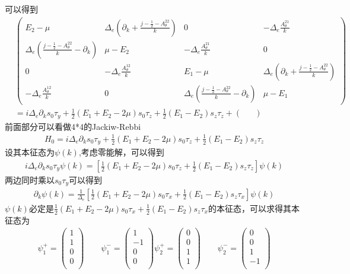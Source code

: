 \documentclass[22pt]{article}
\begin{document}
	可以得到
	\begin{align}
		&\nonumber
		\begin{pmatrix}
			E_2-\mu &\Delta_e(\partial_k+\frac{j-\frac{1}{2}-A_{\theta}^{22}}{k})&0&-\Delta_e\frac{A_{\theta}^{21}}{k}\\
			\Delta_e(\frac{j-\frac{1}{2}-A_{\theta}^{22}}{k}-\partial_k)&\mu-E_2&-\Delta_e\frac{A_{\theta}^{21}}{k}&0\\
			0&-\Delta_e\frac{A_{\theta}^{12}}{k}&E_1-\mu&\Delta_e(\partial_k+\frac{j-\frac{1}{2}-A_{\theta}^{22}}{k})\\
			-\Delta_e\frac{A_{\theta}^{12}}{k}&0&\Delta_e(\frac{j-\frac{1}{2}-A_{\theta}^{22}}{k}-\partial_k)&\mu-E_1
		\end{pmatrix}\\
	&=i\Delta_e\partial_ks_0\tau_y+\frac{1}{2}(E_1+E_2-2\mu)s_0\tau_z+\frac{1}{2}(E_1-E_2)s_z\tau_z+\begin{pmatrix}
		&
	\end{pmatrix}
	\end{align}
前面部分可以看做4*4的Jackiw-Rebbi
\begin{align}
	H_0=i\Delta_e\partial_ks_0\tau_y+\frac{1}{2}(E_1+E_2-2\mu)s_0\tau_z+\frac{1}{2}(E_1-E_2)s_z\tau_z
\end{align}
设其本征态为$\psi(k)$,考虑零能解，可以得到
\begin{align}
	i\Delta_e\partial_ks_0\tau_y\psi(k)=[\frac{1}{2}(E_1+E_2-2\mu)s_0\tau_z+\frac{1}{2}(E_1-E_2)s_z\tau_z]\psi(k)
\end{align}
两边同时乘以$s_0\tau_y$可以得到
\begin{align}
	\partial_k\psi(k)=\frac{1}{\Delta_e}[\frac{1}{2}(E_1+E_2-2\mu)s_0\tau_x+\frac{1}{2}(E_1-E_2)s_z\tau_x]\psi(k)
\end{align}
$\psi(k)$必定是$\frac{1}{2}(E_1+E_2-2\mu)s_0\tau_x+\frac{1}{2}(E_1-E_2)s_z\tau_x$的本征态，可以求得其本征态为
\begin{align}
	\psi_{1}^{+} = \begin{pmatrix}
		1\\
		1\\
		0\\
		0\\
	\end{pmatrix}
	\qquad
	\psi_{1}^{-} = \begin{pmatrix}
		1\\
		-1\\
		0\\
		0\\
	\end{pmatrix}
	\psi_{2}^{+} = \begin{pmatrix}
		0\\
		0\\
		1\\
		1\\
	\end{pmatrix}
	\qquad
	\psi_{2}^{-} = \begin{pmatrix}
		0\\
		0\\
		1\\
		-1\\
	\end{pmatrix}
\end{align}
\end{document}
